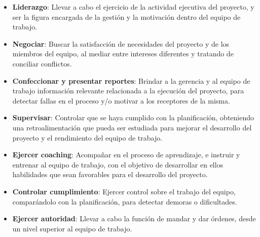 \begin{itemize}
                \item \textbf{Liderazgo}:
                Llevar a cabo el ejercicio de la actividad ejecutiva del proyecto, y ser la figura encargada de la gestión y la motivación dentro del equipo de trabajo.
                
                \item \textbf{Negociar}:
                Buscar la satisfacción de necesidades del proyecto y de los miembros del equipo, al mediar entre intereses diferentes y tratando de conciliar conflictos.
                
                \item \textbf{Confeccionar y presentar reportes}:
                Brindar a la gerencia y al equipo de trabajo información relevante relacionada a la ejecución del proyecto, para detectar fallas en el proceso y/o motivar a los receptores de la misma.
                
                \item \textbf{Supervisar}:
                Controlar que se haya cumplido con la planificación, obteniendo una retroalimentación que pueda ser estudiada para mejorar el desarrollo del proyecto y el rendimiento del equipo de trabajo.
                
                \item \textbf{Ejercer coaching}:
                Acompañar en el proceso de aprendizaje, e instruir y entrenar al equipo de trabajo, con el objetivo de desarrollar en ellos habilidades que sean favorables para el desarrollo del proyecto.
                
                \item \textbf{Controlar cumplimiento}:
                Ejercer control sobre el trabajo del equipo, comparándolo con la planificación, para detectar demoras o dificultades.
                
                \item \textbf{Ejercer autoridad}:
                Llevar a cabo la función de mandar y dar órdenes, desde un nivel superior al equipo de trabajo.
            \end{itemize}
        

